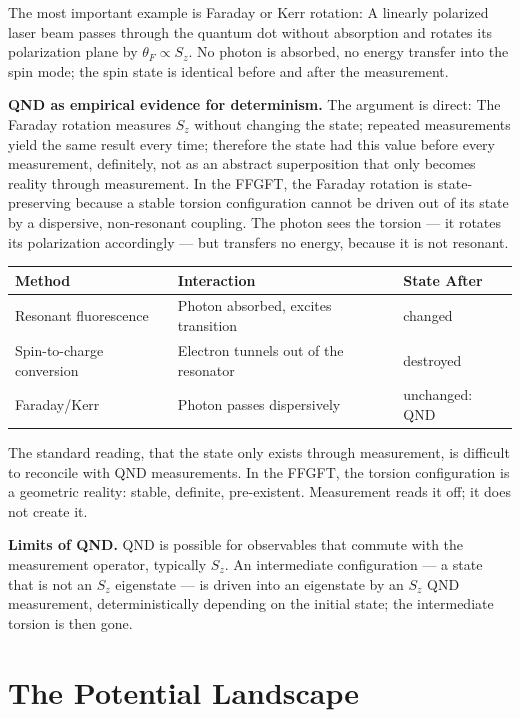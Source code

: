 The most important example is Faraday or Kerr rotation: A linearly
polarized laser beam passes through the quantum dot without absorption and rotates its polarization plane by $\theta_F\propto S_z$. No photon is
absorbed, no energy transfer into the spin mode; the spin state is
identical before and after the measurement.

\textbf{QND as empirical evidence for determinism.} The argument is
direct: The Faraday rotation measures $S_z$ without changing the state;
repeated measurements yield the same result every time; therefore
the state had this value before every measurement, definitely, not as an abstract
superposition that only becomes reality through measurement. In the FFGFT, the Faraday rotation is state-preserving because a stable
torsion configuration cannot be driven out of its state by a dispersive, non-resonant coupling. The photon sees the
torsion --- it rotates its polarization accordingly --- but transfers no energy, because it is not resonant.

\begin{center}
\small\renewcommand{\arraystretch}{1.3}
\begin{tabular}{p{2.4cm}p{3cm}p{2.8cm}}
\toprule
\textbf{Method} & \textbf{Interaction} & \textbf{State After} \\
\midrule
Resonant fluorescence & Photon absorbed, excites transition & changed \\
Spin-to-charge conversion & Electron tunnels out of the resonator & destroyed \\
Faraday/Kerr & Photon passes dispersively & unchanged: QND \\
\bottomrule
\end{tabular}
\end{center}

The standard reading, that the state only exists through measurement, is difficult to reconcile with QND measurements. In the FFGFT, the
torsion configuration is a geometric reality: stable, definite,
pre-existent. Measurement reads it off; it does not create it.

\textbf{Limits of QND.} QND is possible for observables that commute with the
measurement operator, typically $S_z$. An intermediate configuration
--- a state that is not an $S_z$ eigenstate --- is driven into an eigenstate by an
$S_z$ QND measurement, deterministically depending on the initial
state; the intermediate torsion is then gone.

\section{The Potential Landscape}

